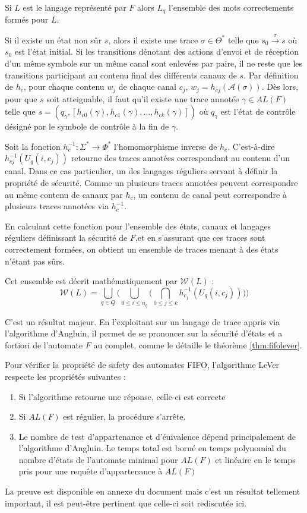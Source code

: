 Si $L$ est le langage représenté par $F$ alors $L_q$ l'ensemble des mots correctements formés pour $L$.

Si il existe un état non sûr $s$, alors il existe une trace $\sigma \in \Theta^*$ telle que $s_0\xrightarrow{\sigma}s$ où $s_0$ est l'état initial. Si les transitions dénotant des actions d'envoi et de réception d'un même symbole sur un même canal sont enlevées par paire, il ne reste que les transitions participant au contenu final des différents canaux de $s$. Par définition de $h_c$, pour chaque contenu $w_j$ de chaque canal $c_j$, $w_j=h_{cj}(\mathcal{A}(\sigma))$. Dès lors, pour que $s$ soit atteignable, il faut qu'il existe une trace annotée $\gamma \in AL(F)$ telle que $s=(q_\gamma, [h_{c0}(\gamma),h_{c1}(\gamma),\dots,h_{ck}(\gamma)])$ où $q_\gamma$ est l'état de contrôle désigné par le symbole de contrôle à la fin de $\gamma$.

Soit la fonction $h^{-1}_{c}:\Sigma^*\rightarrow\Phi^*$ l'homomorphisme inverse de $h_c$. C'est-à-dire $h^{-1}_{cj}(U_q(i,c_j))$ retourne des traces annotées correspondant au contenu d'un canal. Dans ce cas particulier, un des langages réguliers servant à définir la propriété de sécurité. Comme un plusieurs traces annotées peuvent correspondre au même contenu de canaux par $h_c$, un contenu de canal peut correspondre à plusieurs traces annotées via $h^{-1}_c$.

En calculant cette fonction pour l'ensemble des états, canaux et langages réguliers définissant la sécurité de $F$,et en s'assurant que ces traces sont correctement formées, on obtient un ensemble de traces menant à des états n'étant pas sûrs.

Cet ensemble est décrit mathématiquement par $\mathcal{W}(L)$ :
$$
\mathcal{W}(L)=\bigcup_{q\in Q}\big(\bigcup_{0\leq i\leq n_q}\big(\bigcap_{0\leq j \leq k}h_{c_j}^{-1}(U_q(i,c_j))\big)\big)
$$

C'est un résultat majeur. En l'exploitant sur un langage de trace appris via l'algorithme d'Angluin, il permet de se prononcer sur la sécurité d'états et a fortiori de l'automate $F$ au complet, comme le détaille le théorème \ref{thm:fifolever}.

\begin{theorem}\label{thm:fifolever}
  Pour vérifier la propriété de safety des automates FIFO, l'algorithme LeVer respecte les propriétés suivantes :
  \begin{enumerate}
    \item Si l'algorithme retourne une réponse, celle-ci est correcte
    \item Si $AL(F)$ est régulier, la procédure s'arrête.
    \item Le nombre de test d'appartenance et d'éuivalence dépend principalement de l'algorithme d'Angluin. Le temps total est borné en temps polynomial du nombre d'états de l'automate minimal pour $AL(F)$ et linéaire en le temps pris pour une requête d'appartenance à $AL(F)$
  \end{enumerate}
\end{theorem}

La preuve est disponible en annexe du document \cite{Vardhan04} mais c'est un résultat tellement important, il est peut-être pertinent que celle-ci soit rediscutée ici.
